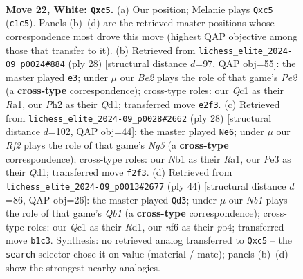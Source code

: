 \documentclass[11pt]{article}
\begin{document}
\begin{figure}[p]\centering
\begin{subfigure}{0.46\textwidth}\centering
\resizebox{\linewidth}{!}{%
\newchessgame
\chessboard[
  setfen={5rk1/3brppp/1n2pn2/p1pq4/6P1/1P1NP3/P3BRPP/RNQ3K1 w - - 1 22},
  showmover=false,
  pgfstyle=straightmove, color=movearrow, markmove={c1-c5}
]}
\caption{}
\end{subfigure}\hfill
\begin{subfigure}{0.46\textwidth}\centering
\resizebox{\linewidth}{!}{%
\newchessgame
\chessboard[
  setfen={r1b1r1k1/p4pbp/5np1/2Bpp2q/8/P4NP1/1P2PPBP/R2Q1RK1 w - - 2 15},
  showmover=false,
  pgfstyle=straightmove, color=movearrow, markmove={e2-e3}
]}
\caption{}
\end{subfigure}
\\[4pt]
\begin{subfigure}{0.46\textwidth}\centering
\resizebox{\linewidth}{!}{%
\newchessgame
\chessboard[
  setfen={r3kb1r/pppq2pp/3p1nn1/3P2N1/2B2B2/7P/PPP3P1/R2Q1RK1 w kq - 1 15},
  showmover=false,
  pgfstyle=straightmove, color=movearrow, markmove={g5-e6}
]}
\caption{}
\end{subfigure}\hfill
\begin{subfigure}{0.46\textwidth}\centering
\resizebox{\linewidth}{!}{%
\newchessgame
\chessboard[
  setfen={4r1k1/r2pbppp/p4n2/4q3/Pp1pN3/6P1/1P2PPBP/RQ1R2K1 w - - 2 23},
  showmover=false,
  pgfstyle=straightmove, color=movearrow, markmove={b1-d3}
]}
\caption{}
\end{subfigure}
\caption{\textbf{Move 22, White: \texttt{Qxc5}.} (a) Our position; Melanie plays \texttt{Qxc5} (\texttt{c1c5}). Panels (b)--(d) are the retrieved master positions whose correspondence most drove this move (highest QAP objective among those that transfer to it). (b) Retrieved from \texttt{lichess\_elite\_2024-09\_p0024\#884} (ply 28) [structural distance $d$=97, QAP obj=55]: the master played \texttt{e3}; under $\mu$ our \emph{Be2} plays the role of that game's \emph{Pe2} (a \textbf{cross-type} correspondence); cross-type roles: our \emph{Q}c1 as their \emph{R}a1, our \emph{P}h2 as their \emph{Q}d1; transferred move \texttt{e2f3}. (c) Retrieved from \texttt{lichess\_elite\_2024-09\_p0028\#2662} (ply 28) [structural distance $d$=102, QAP obj=44]: the master played \texttt{Ne6}; under $\mu$ our \emph{Rf2} plays the role of that game's \emph{Ng5} (a \textbf{cross-type} correspondence); cross-type roles: our \emph{N}b1 as their \emph{R}a1, our \emph{P}e3 as their \emph{Q}d1; transferred move \texttt{f2f3}. (d) Retrieved from \texttt{lichess\_elite\_2024-09\_p0013\#2677} (ply 44) [structural distance $d$=86, QAP obj=26]: the master played \texttt{Qd3}; under $\mu$ our \emph{Nb1} plays the role of that game's \emph{Qb1} (a \textbf{cross-type} correspondence); cross-type roles: our \emph{Q}c1 as their \emph{R}d1, our \emph{n}f6 as their \emph{p}b4; transferred move \texttt{b1c3}. Synthesis: no retrieved analog transferred to \texttt{Qxc5} -- the \texttt{search} selector chose it on value (material / mate); panels (b)--(d) show the strongest nearby analogies.}
\label{fig:thought-m42}
\end{figure}
\end{document}
